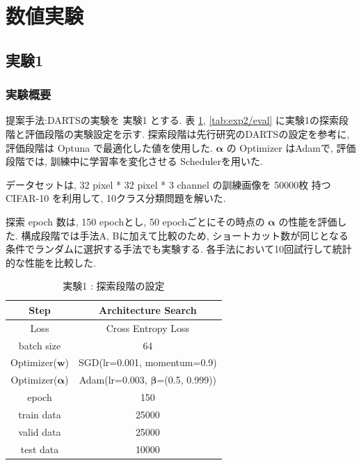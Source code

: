 \newpage
\changeindent{0cm}
\section{数値実験}
\label{sec:exp}
\changeindent{2cm}


\changeindent{0cm}
\subsection{実験1}
\label{sec:exp.01}
\changeindent{2cm}


\changeindent{0cm}
\subsubsection{実験概要}
\label{sec:exp.01_01}
\changeindent{2cm}

提案手法:DARTSの実験を 実験1 とする.
表 \ref{tab:setting_exp}, \ref{tab:exp2/eval} に実験1の探索段階と評価段階の実験設定を示す.
探索段階は先行研究のDARTSの設定を参考に, 評価段階は Optuna で最適化した値を使用した.
$\bm{\alpha}$ の Optimizer はAdam\cite{Kingma2015AdamAM}で,
評価段階では, 訓練中に学習率を変化させる Scheduler\cite{Loshchilov2017SGDRSG}を用いた.

データセットは, 32 pixel * 32 pixel * 3 channel の訓練画像を 50000枚 持つ CIFAR-10\cite{cifar10} を利用して,
10クラス分類問題を解いた.

探索 epoch 数は, 150 epochとし, 50 epochごとにその時点の $\bm{\alpha}$ の性能を評価した.
構成段階では手法A, Bに加えて比較のため,
ショートカット数が同じとなる条件でランダムに選択する手法でも実験する.
各手法において10回試行して統計的な性能を比較した.

\clearpage
\begin{table}[tb]
  \begin{center}
    \caption{実験1 : 探索段階の設定}
  	\vspace{3mm}
    \begin{tabular}{|c|c|} \hline
      Step & Architecture Search \\ \hline\hline
      Loss & Cross Entropy Loss \\ \hline
      batch size & 64 \\ \hline
      Optimizer($\bm{w}$) & SGD(lr=0.001, momentum=0.9) \\ \hline
      Optimizer($\bm{\alpha}$) & Adam(lr=0.003, $\bm{\beta}$=(0.5, 0.999)) \\ \hline
      epoch & 150\\ \hline
      train data & 25000\\ \hline
      valid data & 25000\\ \hline
      test data &  10000\\ \hline
    \end{tabular}
    \label{tab:setting_exp}
  \end{center}
\end{table}

